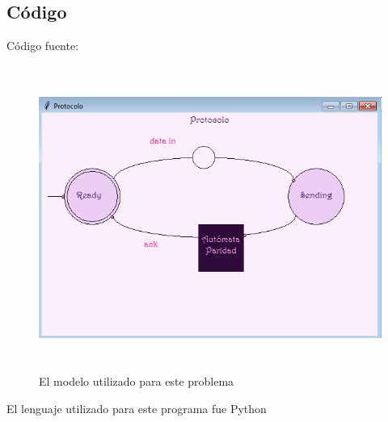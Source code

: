 \documentclass[12pt]{article}
\begin{document}
\subsection{Código}
Código fuente:

\begin{figure}[H]
\includegraphics[width=\textwidth, height=10cm]{protocolografico}
\caption{El modelo utilizado para este problema}
\label{fig:protocolo}
\end{figure}

El lenguaje utilizado para este programa fue Python\\
\end{document}
